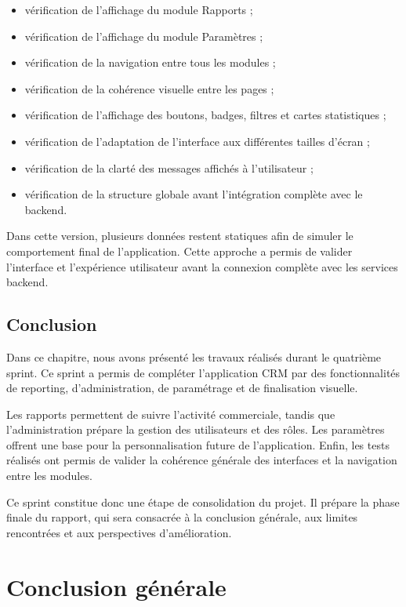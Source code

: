 \documentclass[12pt,a4paper]{report}
\begin{document}
\begin{itemize}
    \item vérification de l’affichage du module Rapports ;
    \item vérification de l’affichage du module Paramètres ;
    \item vérification de la navigation entre tous les modules ;
    \item vérification de la cohérence visuelle entre les pages ;
    \item vérification de l’affichage des boutons, badges, filtres et cartes statistiques ;
    \item vérification de l’adaptation de l’interface aux différentes tailles d’écran ;
    \item vérification de la clarté des messages affichés à l’utilisateur ;
    \item vérification de la structure globale avant l’intégration complète avec le backend.
\end{itemize}

Dans cette version, plusieurs données restent statiques afin de simuler le comportement final de l’application. Cette approche a permis de valider l’interface et l’expérience utilisateur avant la connexion complète avec les services backend.

\section*{Conclusion}

Dans ce chapitre, nous avons présenté les travaux réalisés durant le quatrième sprint. Ce sprint a permis de compléter l’application CRM par des fonctionnalités de reporting, d’administration, de paramétrage et de finalisation visuelle.

Les rapports permettent de suivre l’activité commerciale, tandis que l’administration prépare la gestion des utilisateurs et des rôles. Les paramètres offrent une base pour la personnalisation future de l’application. Enfin, les tests réalisés ont permis de valider la cohérence générale des interfaces et la navigation entre les modules.

Ce sprint constitue donc une étape de consolidation du projet. Il prépare la phase finale du rapport, qui sera consacrée à la conclusion générale, aux limites rencontrées et aux perspectives d’amélioration.

\chapter*{Conclusion générale}
\end{document}
